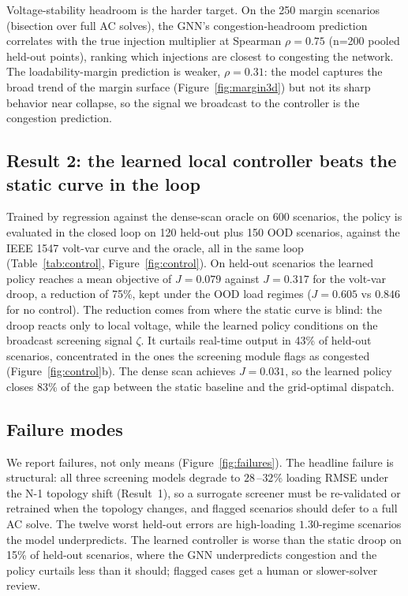 \documentclass{article}
\newcommand{\zt}{\zeta}
\begin{document}
Voltage-stability headroom is the harder target. On the 250 margin
scenarios (bisection over full AC solves), the GNN's congestion-headroom
prediction correlates with the true injection multiplier at Spearman
$\rho=0.75$ (n=200 pooled held-out points), ranking which injections are
closest to congesting the network. The loadability-margin prediction is
weaker, $\rho=0.31$: the model captures the broad trend of the margin
surface (Figure~\ref{fig:margin3d}) but not its sharp behavior near
collapse, so the signal we broadcast to the controller is the congestion
prediction.

\subsection{Result 2: the learned local controller beats the static curve in the loop}

Trained by regression against the dense-scan oracle on 600 scenarios, the
policy is evaluated in the closed loop on 120 held-out plus 150 OOD
scenarios, against the IEEE 1547 volt-var curve and the oracle, all in
the same loop (Table~\ref{tab:control}, Figure~\ref{fig:control}). On held-out scenarios the learned policy reaches a mean objective of
$J=0.079$ against $J=0.317$ for the volt-var droop, a reduction of
75\%, kept under the OOD load regimes ($J=0.605$ vs $0.846$ for no
control). The reduction comes from where the static curve is blind:
the droop reacts only to local voltage, while the learned policy
conditions on the broadcast screening signal $\zt$. It curtails real-time output in 43\% of held-out scenarios,
concentrated in the ones the screening module flags as congested
(Figure~\ref{fig:control}b). The dense
scan achieves $J=0.031$, so the learned policy closes 83\% of
the gap between the static baseline and the grid-optimal dispatch.

\subsection{Failure modes}
\label{sec:fail}

We report failures, not only means (Figure~\ref{fig:failures}). The
headline failure is structural: all three screening models degrade to
$28$\,--$32$\% loading RMSE under the N-1 topology shift (Result~1), so a
surrogate screener must be re-validated or retrained when the topology
changes, and flagged scenarios should defer to a full AC solve. The twelve
worst held-out errors are high-loading $1.30$-regime scenarios the model
underpredicts. The learned controller is worse than the static droop on
15\% of held-out scenarios, where the GNN underpredicts congestion
and the policy curtails less than it should; flagged cases get a human or
slower-solver review.%
\end{document}
